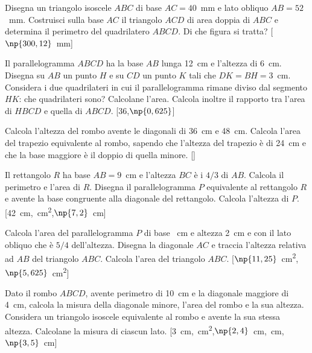 \begin{multicols}{2}
\begin{esercizio}
\label{ese:7.45}
Disegna un triangolo isoscele \(ABC\) di base \(AC=40\)~mm e lato obliquo 
\(AB=52\)~mm. Costruisci sulla base \(AC\) il triangolo \(ACD\) di area 
doppia di \(ABC\) e determina il perimetro del quadrilatero \(ABCD\). Di 
che figura si tratta?
\hfill[\(\np{300,12}\)~mm]
\end{esercizio}

\begin{esercizio}
\label{ese:7.46}
Il parallelogramma \(ABCD\) ha la base \(AB\) lunga 12~cm e l'altezza di 
6~cm. Disegna su \(AB\) un punto \(H\) e su \(CD\) un punto \(K\) tali che 
\(DK=BH=3\)~cm. Considera i due quadrilateri in cui il parallelogramma 
rimane diviso dal segmento \(HK\): che quadrilateri sono? Calcolane 
l'area. Calcola inoltre il rapporto tra l'area di \(HBCD\) e quella di 
\(ABCD\).
\hfill[36,\quad \(\np{0,625}\)]
\end{esercizio}

\begin{esercizio}
\label{ese:7.47}
Calcola l'altezza del rombo avente le diagonali di 36~cm e 48~cm. 
Calcola l'area del trapezio equivalente al rombo, sapendo che 
l'altezza del trapezio è di 24~cm e che la base maggiore è il doppio 
di quella minore.
\hfill[]
\end{esercizio}

\begin{esercizio}
\label{ese:7.48}
Il rettangolo \(R\) ha base \(AB = 9\)~cm e l'altezza \(BC\) è i \(4/3\) di 
\(AB\). Calcola il perimetro e l'area di \(R\). Disegna il 
parallelogramma \(P\) equivalente al rettangolo \(R\) e avente la base 
congruente alla diagonale del rettangolo. Calcola l'altezza di \(P\).
\hfill[42~cm,~cm\textsuperscript{2},\quad \(\np{7,2}\)~cm]
\end{esercizio}

\begin{esercizio}
\label{ese:7.49}
Calcola l'area del parallelogramma \(P\) di base ~cm e altezza 
2~cm e con il lato obliquo che è \(5/4\) dell'altezza. Disegna la 
diagonale \(AC\) e traccia l'altezza relativa ad \(AB\) del triangolo 
\(ABC\). Calcola l'area del triangolo \(ABC\).
\hfill[\(\np{11,25}\)~cm\textsuperscript{2},\quad 
\(\np{5,625}\)~cm\textsuperscript{2}]
\end{esercizio}

\begin{esercizio}
\label{ese:7.51}
Dato il rombo \(ABCD\), avente perimetro di 10~cm e la diagonale 
maggiore di 4~cm, calcola la misura della diagonale minore, l'area 
del rombo e la sua altezza. Considera un triangolo isoscele 
equivalente al rombo e avente la sua stessa altezza. Calcolane la 
misura di ciascun lato.
\hfill[3~cm,~cm\textsuperscript{2},\quad \(\np{2,4}\)~cm,~cm,\quad \(\np{3,5}\)~cm]
\end{esercizio}


\end{multicols}
